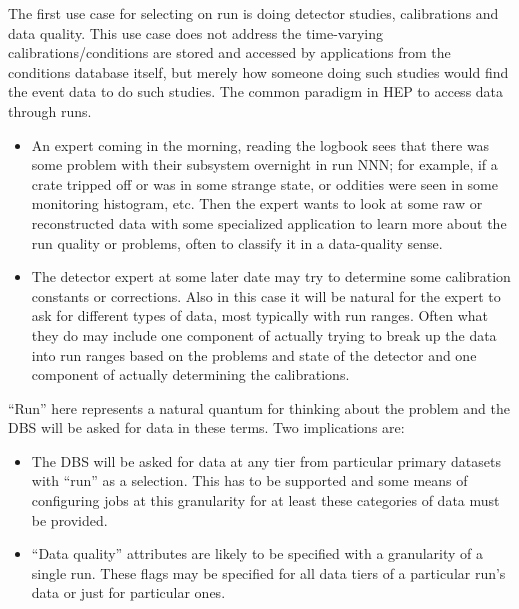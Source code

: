 \documentclass{cmspaper}
\begin{document}
  The first use case for selecting on run is doing detector studies, calibrations
and data quality. This use case does not address the time-varying 
calibrations/conditions are stored and accessed by applications from the 
conditions database itself, but merely how someone doing such studies would 
find the event data to do such studies. The common paradigm in HEP to access 
data through runs.
\begin{itemize}
\item An expert coming in the morning, reading the logbook sees that there was
     some problem with their subsystem overnight in run NNN; for example, if a crate 
     tripped off or was in some strange state, or oddities were seen in some 
     monitoring histogram, etc. Then the expert wants to look at some raw or 
     reconstructed data with some specialized application to learn more about the
     run quality or problems, often to classify it in a data-quality sense.
\item The detector expert at some later date may try to determine
     some calibration constants or corrections. Also in this case it will be natural
     for the expert to ask for different types of data, most typically with
     run ranges. Often what they do may include one component of actually 
     trying to break up the data into run ranges based on the problems and
     state of the detector and one component of actually determining the
     calibrations. 
\end{itemize}

``Run'' here represents a natural quantum for thinking about the problem and
the DBS will be asked for data in these terms. Two implications are:
\begin{itemize}
\item The DBS will be asked for data at any tier from particular
    primary datasets with ``run'' as a selection. This has to be supported and
    some means of configuring jobs at this granularity for at least these
    categories of data must be provided.
\item ``Data quality'' attributes are likely 
    to be specified with a granularity of a single run. These flags may be
    specified for all data tiers of a particular run's data or just
    for particular ones. 
\end{itemize}
\end{document}
